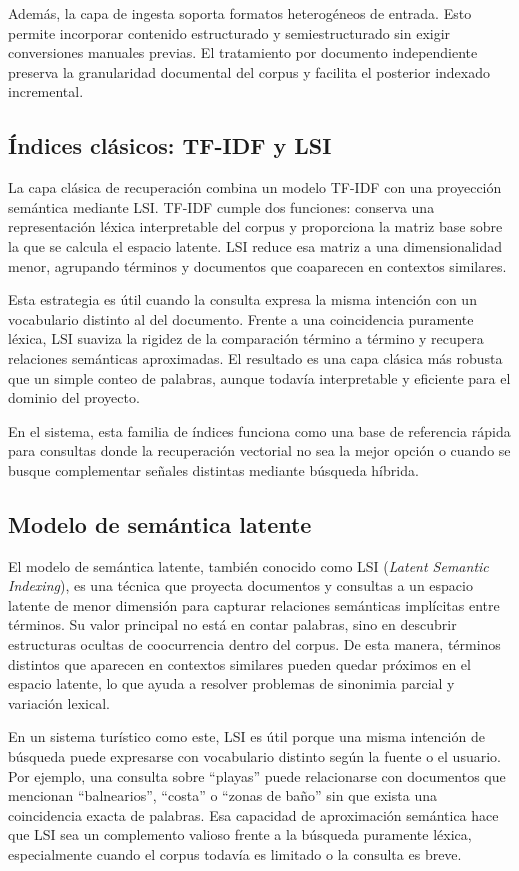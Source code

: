\documentclass{llncs}
\begin{document}
Además, la capa de ingesta soporta formatos heterogéneos de entrada. Esto permite incorporar contenido estructurado y semiestructurado sin exigir conversiones manuales previas. El tratamiento por documento independiente preserva la granularidad documental del corpus y facilita el posterior indexado incremental.

\subsection{Índices clásicos: TF-IDF y LSI}

La capa clásica de recuperación combina un modelo TF-IDF con una proyección semántica mediante LSI. TF-IDF cumple dos funciones: conserva una representación léxica interpretable del corpus y proporciona la matriz base sobre la que se calcula el espacio latente. LSI reduce esa matriz a una dimensionalidad menor, agrupando términos y documentos que coaparecen en contextos similares.

Esta estrategia es útil cuando la consulta expresa la misma intención con un vocabulario distinto al del documento. Frente a una coincidencia puramente léxica, LSI suaviza la rigidez de la comparación término a término y recupera relaciones semánticas aproximadas. El resultado es una capa clásica más robusta que un simple conteo de palabras, aunque todavía interpretable y eficiente para el dominio del proyecto.

En el sistema, esta familia de índices funciona como una base de referencia rápida para consultas donde la recuperación vectorial no sea la mejor opción o cuando se busque complementar señales distintas mediante búsqueda híbrida.

\subsection{Modelo de semántica latente}
El modelo de semántica latente, también conocido como LSI (\textit{Latent Semantic Indexing}), es una técnica que proyecta documentos y consultas a un espacio latente de menor dimensión para capturar relaciones semánticas implícitas entre términos. Su valor principal no está en contar palabras, sino en descubrir estructuras ocultas de coocurrencia dentro del corpus. De esta manera, términos distintos que aparecen en contextos similares pueden quedar próximos en el espacio latente, lo que ayuda a resolver problemas de sinonimia parcial y variación lexical.

En un sistema turístico como este, LSI es útil porque una misma intención de búsqueda puede expresarse con vocabulario distinto según la fuente o el usuario. Por ejemplo, una consulta sobre ``playas'' puede relacionarse con documentos que mencionan ``balnearios'', ``costa'' o ``zonas de baño'' sin que exista una coincidencia exacta de palabras. Esa capacidad de aproximación semántica hace que LSI sea un complemento valioso frente a la búsqueda puramente léxica, especialmente cuando el corpus todavía es limitado o la consulta es breve.
\end{document}
